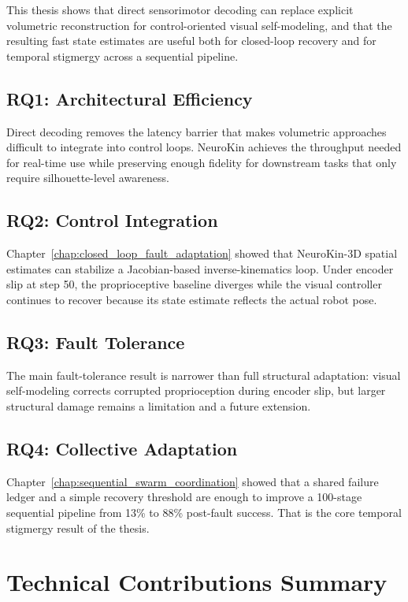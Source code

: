 \documentclass[12pt,a4paper,oneside]{report}
\begin{document}
This thesis shows that direct sensorimotor decoding can replace explicit volumetric reconstruction for control-oriented visual self-modeling, and that the resulting fast state estimates are useful both for closed-loop recovery and for temporal stigmergy across a sequential pipeline.
\subsection{RQ1: Architectural Efficiency}
\label{subsec:rq1_architectural_efficiency_1}

Direct decoding removes the latency barrier that makes volumetric approaches difficult to integrate into control loops. NeuroKin achieves the throughput needed for real-time use while preserving enough fidelity for downstream tasks that only require silhouette-level awareness.
\subsection{RQ2: Control Integration}
\label{subsec:rq2_control_integration_1}

Chapter~\ref{chap:closed_loop_fault_adaptation} showed that NeuroKin-3D spatial estimates can stabilize a Jacobian-based inverse-kinematics loop. Under encoder slip at step 50, the proprioceptive baseline diverges while the visual controller continues to recover because its state estimate reflects the actual robot pose.
\subsection{RQ3: Fault Tolerance}
\label{subsec:rq3_fault_tolerance_1}

The main fault-tolerance result is narrower than full structural adaptation: visual self-modeling corrects corrupted proprioception during encoder slip, but larger structural damage remains a limitation and a future extension.
\subsection{RQ4: Collective Adaptation}
\label{subsec:rq4_collective_adaptation_1}

Chapter~\ref{chap:sequential_swarm_coordination} showed that a shared failure ledger and a simple recovery threshold are enough to improve a 100-stage sequential pipeline from 13\% to 88\% post-fault success. That is the core temporal stigmergy result of the thesis.
\section{Technical Contributions Summary}
\end{document}
